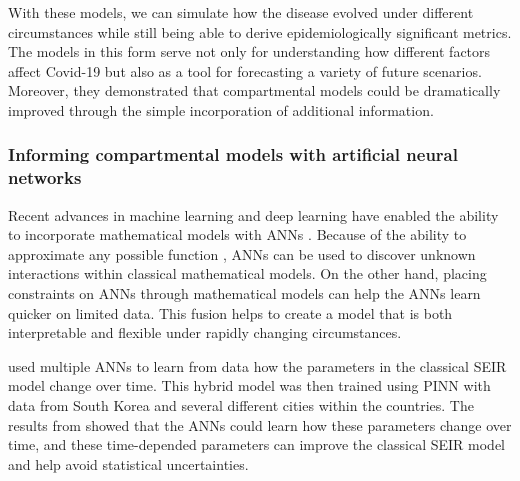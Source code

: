 With these models, we can simulate how the disease evolved under different circumstances while still being able to derive epidemiologically significant metrics.
The models in this form serve not only for understanding how different factors affect Covid-19 but also as a tool for forecasting a variety of future scenarios.
Moreover, they demonstrated that compartmental models could be dramatically improved through the simple incorporation of additional information.

\subsubsection{Informing compartmental models with artificial neural networks}

Recent advances in machine learning and deep learning have enabled the ability to incorporate mathematical models with \glspl{ANN} \cite{raissiPhysicsinformedNeuralNetworks2019, chenNeuralOrdinaryDifferential2019, rackauckasUniversalDifferentialEquations2020}.
Because of the ability to approximate any possible function \cite{cybenkotApproximationSuperpositionsSigmoidal, hornikApproximationCapabilitiesMultilayer1991, hornikMultilayerFeedforwardNetworks1989}, \glspl{ANN} can be used to discover unknown interactions within classical mathematical models.
On the other hand, placing constraints on \glspl{ANN} through mathematical models can help the \glspl{ANN} learn quicker on limited data.
This fusion helps to create a model that is both interpretable and flexible under rapidly changing circumstances.

\citeauthor{jungRealWorldImplicationsRapidly2020} \cite{jungRealWorldImplicationsRapidly2020} used multiple \glspl{ANN} to learn from data how the parameters in the classical \gls{SEIR} model change over time.
This hybrid model was then trained using \gls{PINN} \cite{raissiPhysicsinformedNeuralNetworks2019} with data from South Korea and several different cities within the countries.
The results from \cite{jungRealWorldImplicationsRapidly2020} showed that the \glspl{ANN} could learn how these parameters change over time, and these time-depended parameters can improve the classical \gls{SEIR} model and help avoid statistical uncertainties.

